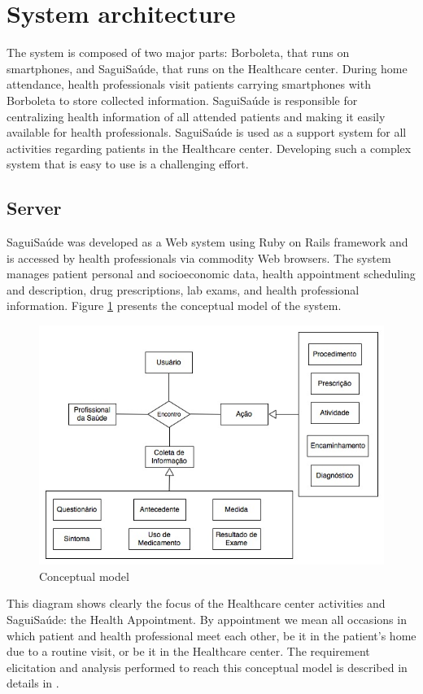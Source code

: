 \documentclass[12pt]{article}
\begin{document}
\section{System architecture}
The system is composed of two major parts: Borboleta, that runs on smartphones, and SaguiSaúde, that runs on the Healthcare center. During home attendance, health professionals visit patients carrying smartphones with Borboleta to store collected information. SaguiSaúde is responsible for centralizing health information of all attended patients and making it easily available for health professionals. SaguiSaúde is used as a support system for all activities regarding patients in the Healthcare center. Developing such a complex system that is easy to use is a challenging effort.


\subsection{Server}
SaguiSaúde was developed as a Web system using Ruby on Rails framework and is accessed by health professionals via commodity Web browsers. The system manages patient personal and socioeconomic data, health appointment scheduling and description, drug prescriptions, lab exams, and health professional information. Figure \ref{dataModel} presents the conceptual model of the system.

\begin{figure}[ht]
\centering
\includegraphics[width=.60\textwidth]{images/ModeloConceitualSagui.jpg}
\caption{Conceptual model}
\label{dataModel}
\end{figure}


This diagram shows clearly the focus of the Healthcare center activities and SaguiSaúde: the Health Appointment. By appointment we mean all occasions in which patient and health professional meet each other, be it in the patient's home due to a routine visit, or be it in the Healthcare center. The requirement elicitation and analysis performed to reach this conceptual model is described in details in \cite{sagui}.
\end{document}
